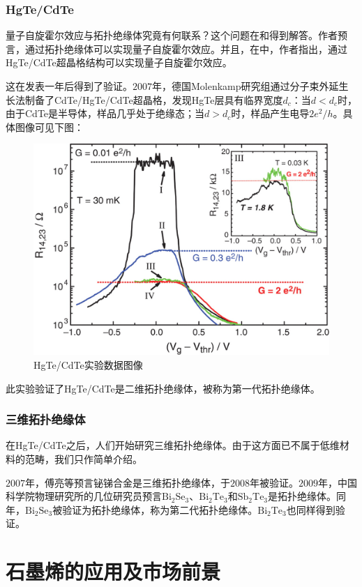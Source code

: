 \subsubsection{HgTe/CdTe}

量子自旋霍尔效应与拓扑绝缘体究竟有何联系？这个问题在\cite{Kane2005Z}和\cite{Bernevig2006}得到解答。作者预言，通过拓扑绝缘体可以实现量子自旋霍尔效应。并且，在\cite{Bernevig2006}中，作者指出，通过HgTe/CdTe超晶格结构可以实现量子自旋霍尔效应。

这在\cite{Bernevig2006}发表一年后得到了验证。$2007$年，德国Molenkamp研究组通过分子束外延生长法制备了CdTe/HgTe/CdTe超晶格，发现HgTe层具有临界宽度$d_c$：当$d<d_c$时，由于CdTe是半导体，样品几乎处于绝缘态；当$d>d_c$时，样品产生电导$2e^2/h$\cite{Konig2007}。具体图像可见下图：

\begin{figure}
    \centering
    \includegraphics[scale=0.4]{img/HgTe+CdTe}
    \caption{HgTe/CdTe实验数据图像}
\end{figure}

此实验验证了HgTe/CdTe是二维拓扑绝缘体，被称为第一代拓扑绝缘体。

\subsubsection{三维拓扑绝缘体}

在HgTe/CdTe之后，人们开始研究三维拓扑绝缘体。由于这方面已不属于低维材料的范畴，我们只作简单介绍。

$2007$年，傅亮等预言铋锑合金是三维拓扑绝缘体\cite{Fu2007}，于$2008$年被验证\cite{Hsieh2008}。$2009$年，中国科学院物理研究所的几位研究员预言$\mathrm{Bi}_2\mathrm{Se}_3$、$\mathrm{Bi}_2\mathrm{Te}_3$和$\mathrm{Sb}_2\mathrm{Te}_3$是拓扑绝缘体\cite{Zhang2009}。同年，$\mathrm{Bi}_2\mathrm{Se}_3$被验证为拓扑绝缘体\cite{Xia2009}，称为第二代拓扑绝缘体。$\mathrm{Bi}_2\mathrm{Te}_3$也同样得到验证\cite{Chen2009}。

\section{石墨烯的应用及市场前景}